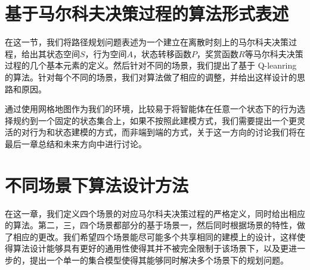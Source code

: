 \documentclass{standalone}
\begin{document}
\section{基于马尔科夫决策过程的算法形式表述}
在这一节，我们将路径规划问题表述为一个建立在离散时刻上的马尔科夫决策过程，给出其状态空间$S$，行为空间$A$，状态转移函数$P$，奖赏函数$R$等马尔科夫决策过程的几个基本元素的定义。然后针对不同的场景，我们提出了基于
Q-leanring 的算法。针对每个不同的场景，我们对算法做了相应的调整，并给出这样设计的思路和原因。\par
通过使用网格地图作为我们的环境，比较易于将智能体在任意一个状态下的行为选择规约到一个固定的状态集合上，如果不按照此建模方式，我们需要提出一个更灵活的对行为和状态建模的方式，而非端到端的方式，关于这一方向的讨论我们将在最后一章总结和未来方向中进行讨论。

\section{不同场景下算法设计方法}
在这一章，我们定义四个场景的对应马尔科夫决策过程的严格定义，同时给出相应的算法。第二，三，四个场景都部分的基于场景一，然后同时根据场景的特性，做了相应的更改。我们希望四个场景能尽可能多个共享相同的建模上的设计，这样使得算法设计能够具有更好的通用性使得其并不被完全限制于该场景下，以及更进一步的，提出一个单一的集合模型使得其能够同时解决多个场景下的规划问题。
\end{document}
